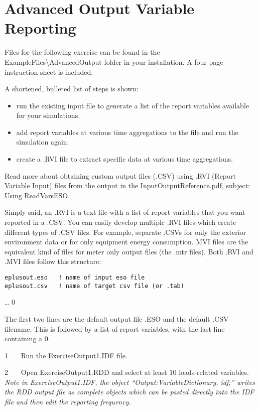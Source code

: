 \section{Advanced Output Variable Reporting}\label{advanced-output-variable-reporting}

Files for the following exercise can be found in the ExampleFiles\textbackslash{}AdvancedOutput folder in your installation. A four page instruction sheet is included.

A shortened, bulleted list of steps is shown:

\begin{itemize}
\item
  run the existing input file to generate a list of the report variables available for your simulations.
\item
  add report variables at various time aggregations to the file and run the simulation again.
\item
  create a .RVI file to extract specific data at various time aggregations.
\end{itemize}

Read more about obtaining custom output files (.CSV) using .RVI (Report Variable Input) files from the output in the InputOutputReference.pdf, subject: Using ReadVarsESO.

Simply said, an .RVI is a text file with a list of report variables that you want reported in a .CSV. You can easily develop multiple .RVI files which create different types of .CSV files. For example, separate .CSVs for only the exterior environment data or for only equipment energy consumption. MVI files are the equivalent kind of files for meter only output files (the .mtr files). Both .RVI and .MVI files follow this structure:

\begin{lstlisting}
eplusout.eso   ! name of input eso file
eplusout.csv   ! name of target csv file (or .tab)
\end{lstlisting}

 \ldots{} 0

The first two lines are the default output file .ESO and the default .CSV filename. This is followed by a list of report variables, with the last line containing a 0.

1~~~ Run the ExerciseOutput1.IDF file.

2~~~ Open ExerciseOutput1.RDD and select at least 10 loads-related variables. \emph{Note in ExerciseOutput1.IDF, the object ``Output:VariableDictionary, idf;'' writes the RDD output file as complete objects which can be pasted directly into the IDF file and then edit the reporting frequency.}

